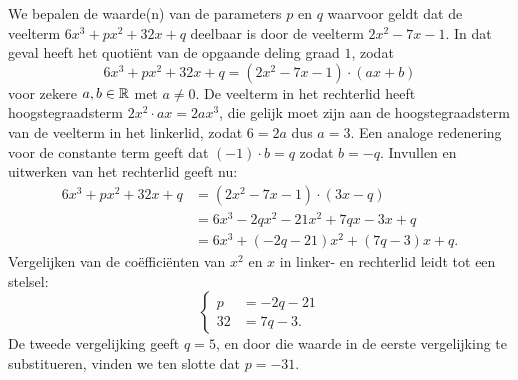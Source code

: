 \documentclass{ximera}
\begin{document}
\begin{example} 
We bepalen de waarde(n) van de parameters $p$ en $q$ waarvoor geldt dat de veelterm $6x^3+px^2+32x+q$ deelbaar is door de veelterm $2x^2-7x-1$. In dat geval heeft het quotiënt van de opgaande deling graad $1$, zodat 
\[
6x^3+px^2+32x+q = (2x^2-7x-1)\cdot (ax+b)
\]
voor zekere $a,b \in \mathbb{R}$ met $a \neq 0$. De veelterm in het rechterlid heeft hoogstegraadsterm $2x^2 \cdot ax = 2ax^3$, die gelijk moet zijn aan de hoogstegraadsterm van de veelterm in het linkerlid, zodat $6 = 2a$ dus $a = 3$. Een analoge redenering voor de constante term geeft dat $(-1) \cdot b = q$ zodat $b = -q$. Invullen en uitwerken van het rechterlid geeft nu:
\begin{align*}
6x^3+px^2+32x+q 
& = (2x^2-7x-1)\cdot (3x-q) \\
& = 6x^3 - 2qx^2 - 21x^2 + 7qx - 3x + q \\
& = 6x^3 + (-2q-21)x^2 + (7q-3)x+q.
\end{align*}
Vergelijken van de coëfficiënten van $x^2$ en $x$ in linker- en rechterlid leidt tot een stelsel:
\[
\left\{ 
\begin{aligned}
p & = -2q - 21 \\
32 & = 7q - 3. 
\end{aligned}
\right.
\]
De tweede vergelijking geeft $q = 5$, en door die waarde in de eerste vergelijking te substitueren, vinden we ten slotte dat $p = -31$.  
\end{example} 
\end{document}
